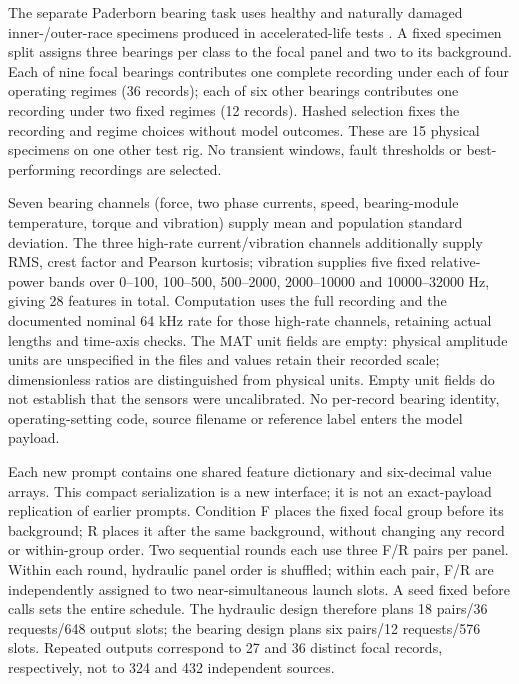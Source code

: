 \documentclass[11pt,a4paper]{article}
\begin{document}
The separate Paderborn bearing task uses healthy and naturally damaged inner-/outer-race specimens produced in accelerated-life tests \citep{lessmeier2016benchmark}. A fixed specimen split assigns three bearings per class to the focal panel and two to its background. Each of nine focal bearings contributes one complete recording under each of four operating regimes (36 records); each of six other bearings contributes one recording under two fixed regimes (12 records). Hashed selection fixes the recording and regime choices without model outcomes. These are 15 physical specimens on one other test rig. No transient windows, fault thresholds or best-performing recordings are selected.

Seven bearing channels (force, two phase currents, speed, bearing-module temperature, torque and vibration) supply mean and population standard deviation. The three high-rate current/vibration channels additionally supply RMS, crest factor and Pearson kurtosis; vibration supplies five fixed relative-power bands over 0--100, 100--500, 500--2000, 2000--10000 and 10000--32000 Hz, giving 28 features in total. Computation uses the full recording and the documented nominal 64 kHz rate for those high-rate channels, retaining actual lengths and time-axis checks. The MAT unit fields are empty: physical amplitude units are unspecified in the files and values retain their recorded scale; dimensionless ratios are distinguished from physical units. Empty unit fields do not establish that the sensors were uncalibrated. No per-record bearing identity, operating-setting code, source filename or reference label enters the model payload.

Each new prompt contains one shared feature dictionary and six-decimal value arrays. This compact serialization is a new interface; it is not an exact-payload replication of earlier prompts. Condition F places the fixed focal group before its background; R places it after the same background, without changing any record or within-group order. Two sequential rounds each use three F/R pairs per panel. Within each round, hydraulic panel order is shuffled; within each pair, F/R are independently assigned to two near-simultaneous launch slots. A seed fixed before calls sets the entire schedule. The hydraulic design therefore plans 18 pairs/36 requests/648 output slots; the bearing design plans six pairs/12 requests/576 slots. Repeated outputs correspond to 27 and 36 distinct focal records, respectively, not to 324 and 432 independent sources.
\end{document}
